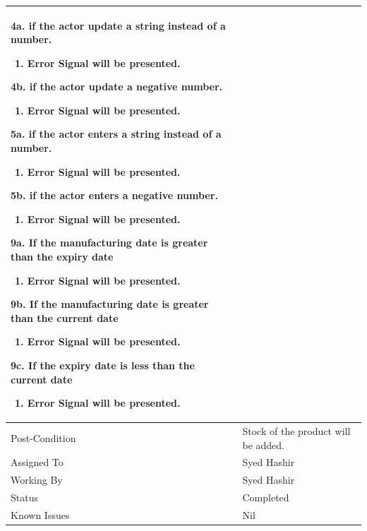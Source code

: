 \documentclass[12pt,a4paper]{article}
\begin{document}
\begin{longtable}{| p{3cm}|p{12cm}|}
4a. if the actor update a string instead of a number.
 	\begin{enumerate}
		\item Error Signal will be presented.
	\end{enumerate}
4b. if the actor update a negative number.
 	\begin{enumerate}
		\item Error Signal will be presented.
	\end{enumerate}
5a. if the actor enters a string instead of a number.
 	\begin{enumerate}
		\item Error Signal will be presented.
	\end{enumerate}
5b. if the actor enters a negative number.
 	\begin{enumerate}
		\item Error Signal will be presented.
	\end{enumerate}
9a. If the manufacturing date is greater than the expiry date
	\begin{enumerate}
		\item Error Signal will be presented.
	\end{enumerate}
9b. If the manufacturing date is greater than the current date
	\begin{enumerate}
		\item Error Signal will be presented.
	\end{enumerate}
9c. If the expiry date is less than the current date
	\begin{enumerate}
		\item Error Signal will be presented.
	\end{enumerate}
\\ \hline
Post-Condition &  Stock of the product will be added. \\ \hline
Assigned To &  Syed Hashir
\\ \hline
Working By &   Syed Hashir
\\ \hline
Status & 	Completed	
\\ \hline
Known Issues & Nil
\\\hline
\end{longtable}
\end{document}
